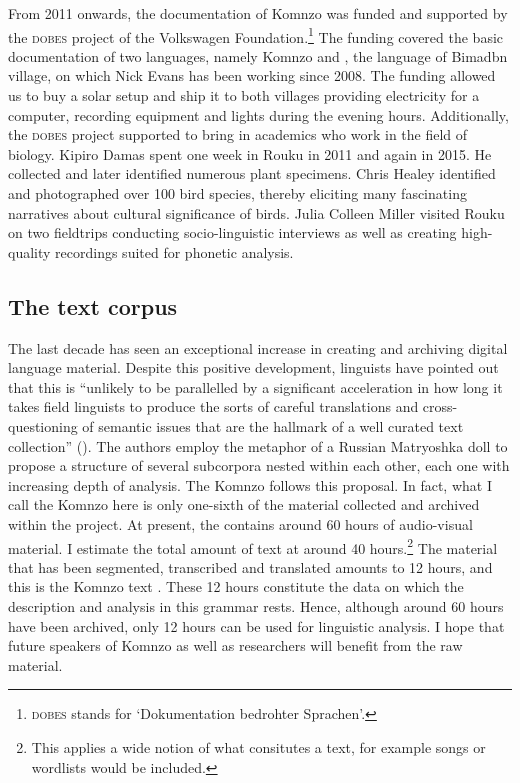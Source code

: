 From 2011 onwards, the documentation of Komnzo was funded and supported by the \textsc{dobes} project of the Volkswagen Foundation.\footnote{\textsc{dobes} stands for  `Dokumentation bedrohter Sprachen'.} The funding covered the basic documentation of two languages, namely Komnzo and , the language of Bimadbn village, on which Nick Evans has been working since 2008. The funding allowed us to buy a solar setup and ship it to both villages providing electricity for a computer, recording equipment and lights during the evening hours. Additionally, the \textsc{dobes} project supported to bring in academics who work in the field of biology. Kipiro Damas spent one week in Rouku in 2011 and again in 2015. He collected and later identified numerous plant specimens. Chris Healey identified and photographed over 100 bird species, thereby eliciting many fascinating narratives about cultural significance of birds. Julia Colleen Miller visited Rouku on two fieldtrips conducting socio-linguistic interviews as well as creating high-quality recordings suited for phonetic analysis.

\subsection{The text corpus}\label{thetextcorpus}

The last decade has seen an exceptional increase in creating and archiving digital language material. Despite this positive development, linguists have pointed out that this is ``unlikely to be parallelled by a significant acceleration in how long it takes field linguists to produce the sorts of careful translations and cross-questioning of semantic issues that are the hallmark of a well curated text collection'' (\citealt[25]{Evans:2006uu}). The authors employ the metaphor of a Russian Matryoshka doll to propose a structure of several subcorpora nested within each other, each one with increasing depth of analysis. The Komnzo  follows this proposal. In fact, what I call the Komnzo  here is only one-sixth of the material collected and archived within the project. At present, the  contains around 60 hours of audio-visual material. I estimate the total amount of text at around 40 hours.\footnote{This applies a wide notion of what consitutes a text, for example songs or wordlists would be included.} The material that has been segmented, transcribed and translated amounts to 12 hours, and this is the Komnzo text . These 12 hours constitute the data on which the description and analysis in this grammar rests. Hence, although around 60 hours have been archived, only 12 hours can be used for linguistic analysis. I hope that future speakers of Komnzo as well as researchers will benefit from the raw material.%

